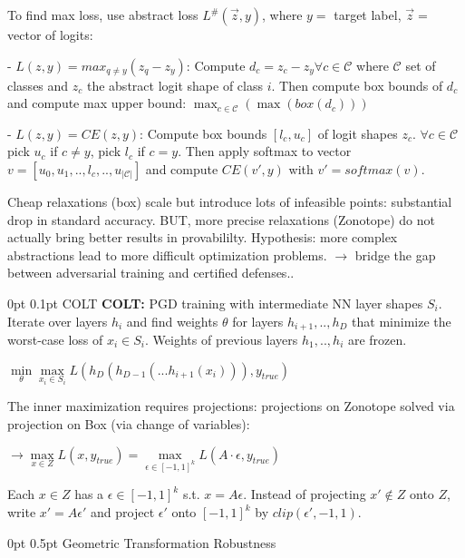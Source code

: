 \documentclass[11pt,landscape,a4paper,fleqn]{article}
\makeatletter
\renewcommand{\section}{\@startsection{section}{1}{0mm}%
                                {0pt}%
                                {0.5pt}%
                                {\color{myorange}\sffamily\small\bfseries}}
\renewcommand{\subsection}{\@startsection{subsection}{1}{0mm}%
                                {0pt}%
                                {0.1pt}%
                            	{\color{myorange2}\sffamily\small}}
\makeatother
\begin{document}
\begin{multicols*}{4}
To find max loss, use abstract loss $L^\#(\vec{z}, y)$, where $y = $ target label, $\vec{z} = $ vector of logits:
\vspace*{1mm}

- $L(z, y) = max_{q \neq y} (z_q - z_y)$: Compute {$d_c = z_c - z_y \forall c \in \mathcal{C}$} where $\mathcal{C}$ set of classes and $z_c$ the abstract logit shape of class $i$. Then compute box bounds of $d_c$ and compute max upper bound: {$\max_{c \in \mathcal{C}}(\max(box(d_c)))$}

- $L(z,y) = CE(z,y)$: Compute box bounds $[l_c, u_c]$ of logit shapes $z_c$. $\forall c \in \mathcal{C}$ pick $u_c$ if $c \neq y$, pick $l_c$ if $c = y$. Then {apply softmax to vector $v = [u_0, u_1,.., l_c,.., u_{|\mathcal{C}|}]$ and compute $CE(v', y)$ with $v' = softmax(v)$.}

Cheap relaxations (box) scale but introduce lots of infeasible points: substantial drop in standard accuracy.
BUT, more precise relaxations (Zonotope) do not actually bring better results in provabililty. Hypothesis: more complex abstractions lead to more difficult optimization problems. $\rightarrow$ bridge the gap between adversarial training and certified defenses..
\vspace*{2mm}

\subsection{COLT}
\textbf{COLT:} PGD training with intermediate NN layer shapes $S_i$. Iterate over layers $h_i$ and find weights $\theta$ for layers $h_{i+1},..,h_D$ that minimize the worst-case loss of $x_i \in S_i$. Weights of previous layers $h_1,..,h_{i}$ are frozen.

{$\min\limits_\theta \max\limits_{x_i \in S_i} L(h_D(h_{D-1}(... h_{i+1}(x_i))), y_{true})$}

The inner maximization requires projections: projections on Zonotope solved via projection on Box (via change of variables):

$\rightarrow \max\limits_{x \in Z} L(x, y_{true}) = \max\limits_{\epsilon \in [-1,1]^k} L(A \cdot \epsilon, y_{true})$

Each $x \in Z$ has a $\epsilon \in [-1,1]^k$ s.t. $x = A \epsilon$. Instead of projecting $x' \notin Z$ onto $Z$, write $x' = A \epsilon'$ and project $\epsilon'$ onto $[-1,1]^k$ by $clip(\epsilon', -1, 1)$.

\section{Geometric Transformation Robustness}


\end{multicols*}
\end{document}
